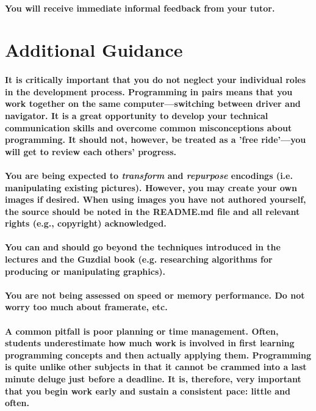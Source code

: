 \documentclass{../../fal_assignment}
\begin{document}
\paragraph{You will receive immediate \textbf{informal feedback} from your \textbf{tutor}.}

\section*{Additional Guidance}

\paragraph{It is critically important that you do not neglect your individual roles in the development process. Programming in pairs means that you work together on the same computer---switching between driver and navigator. It is a great opportunity to develop your technical communication skills and overcome common misconceptions about programming. It should not, however, be treated as a 'free ride'---you will get to review each others' progress.}

\paragraph{You are being expected to \textit{transform} and \textit{repurpose} encodings (i.e. manipulating existing pictures). However, you may create your own images if desired. When using images you have not authored yourself, the source should be noted in the README.md file and all relevant rights (e.g., copyright) acknowledged. }

\paragraph{You can and should go beyond the techniques introduced in the lectures and the Guzdial book (e.g. researching algorithms for producing or manipulating graphics).}

\paragraph{You are not being assessed on speed or memory performance. Do not worry too much about framerate, etc.}

\paragraph{A common pitfall is poor planning or time management. Often, students underestimate how much work is involved in first learning programming concepts and then actually applying them. Programming is quite unlike other subjects in that it cannot be crammed into a last minute deluge just before a deadline. It is, therefore, very important that you begin work early and sustain a consistent pace: little and often.}
\end{document}
